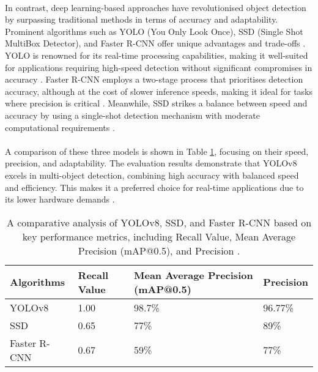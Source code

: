 \paragraph*{} 
In contrast, deep learning-based approaches have revolutionised object detection by surpassing traditional methods in terms of accuracy and adaptability. Prominent algorithms such as YOLO (You Only Look Once), SSD (Single Shot MultiBox Detector), and Faster R-CNN offer unique advantages and trade-offs \cite{sachan2019object}. YOLO is renowned for its real-time processing capabilities, making it well-suited for applications requiring high-speed detection without significant compromises in accuracy \cite{redmon2016you}. Faster R-CNN employs a two-stage process that prioritises detection accuracy, although at the cost of slower inference speeds, making it ideal for tasks where precision is critical \cite{ren2015faster}. Meanwhile, SSD strikes a balance between speed and accuracy by using a single-shot detection mechanism with moderate computational requirements \cite{liu2016ssd}.

\paragraph*{} 
A comparison of these three models is shown in Table \ref{tab:performance_metrics}, focusing on their speed, precision, and adaptability. The evaluation results demonstrate that YOLOv8 excels in multi-object detection, combining high accuracy with balanced speed and efficiency. This makes it a preferred choice for real-time applications due to its lower hardware demands \cite{kaliappan2023real}.

\begin{table}[!h]
    \centering
    \begin{tabular}{| p{3.5cm} | p{3cm} | p{4cm} | p{3.5cm} |}
        \hline
        Algorithms  & Recall Value  & Mean Average Precision (mAP@0.5)  & Precision \\ \hline
        YOLOv8  & 1.00  & 98.7\%  & 96.77\% \\ \hline
        SSD  & 0.65  & 77\%  & 89\% \\ \hline
        Faster R-CNN  & 0.67  & 59\%  & 77\% \\ \hline
    \end{tabular}
    \caption{A comparative analysis of YOLOv8, SSD, and Faster R-CNN based on key performance metrics, including Recall Value, Mean Average Precision (mAP@0.5), and Precision \cite{kaliappan2023performance}.}
    \label{tab:performance_metrics}
\end{table}

